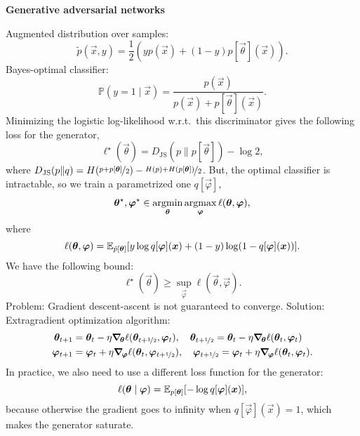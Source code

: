 \documentclass[10pt]{article}
\newenvironment{topic}[1]
{\textbf{\sffamily \colorbox{black}{\rlap{\textbf{\textcolor{white}{#1}}}\hspace{\linewidth}\hspace{-2\fboxsep}}}}
{}
\newenvironment{subtopic}[1]
{\begin{center}\textbf{\sffamily #1}\end{center}}
{}
\begin{document}
\begin{multicols*}{3}
\begin{topic}{Generative models}
\begin{subtopic}{Generative adversarial networks}
            Augmented distribution over samples: \[
                \tilde{p}(\vec{x},y) = \frac{1}{2} (yp(\vec{x}) + (1-y)p[\vec{\theta}](\vec{x})).
            \]
            Bayes-optimal classifier: \[
                \mathbb{P}(y=1 \mid \vec{x}) = \frac{p(\vec{x})}{p(\vec{x}) + p[\vec{\theta}](\vec{x})}.
            \]
            Minimizing the logistic log-likelihood w.r.t.\ this discriminator gives the following loss for the
            generator, \[
                \ell^\star(\vec{\theta}) = D_{\mathrm{JS}}(p \| p[\vec{\theta}]) - \log 2,
            \]
            where $D_{\mathrm{JS}}(p \| q) = H(\nicefrac{p + p[\vec{\theta}]}{2}) - \nicefrac{H(p) +
                    H(p[\vec{\theta}])}{2}$. But, the optimal classifier is intractable, so we train a parametrized one
            $q[\vec{\varphi}]$, \[
                \vec{\theta}^\star, \vec{\varphi}^\star \in \argmin_{\vec{\theta}} \argmax_{\vec{\varphi}} \ell(\vec{\theta}, \vec{\varphi}),
            \]
            where \[
                \ell(\vec{\theta}, \vec{\varphi}) = \E_{\tilde{p}[\vec{\theta}]}[y \log q[\vec{\varphi}](\vec{x}) + (1-y) \log (1-q[\vec{\varphi}](\vec{x}))].
            \]
            We have the following bound: \[
                \ell^\star(\vec{\theta}) \geq \sup_{\vec{\varphi}} \ell(\vec{\theta}, \vec{\varphi}).
            \]
            Problem: Gradient descent-ascent is not guaranteed to converge. Solution: Extragradient
            optimization algorithm:
            \begin{align*}
                \vec{\theta}_{t+1}  & = \vec{\theta}_t - \eta \grad{\ell(\vec{\theta}_{t+\nicefrac{1}{2}}, \vec{\varphi}_t)}{\vec{\theta}}, \quad \vec{\theta}_{t+\nicefrac{1}{2}} = \vec{\theta}_t - \eta \grad{\ell(\vec{\theta}_t, \vec{\varphi}_t)}{\vec{\theta}}       \\
                \vec{\varphi}_{t+1} & = \vec{\varphi}_t + \eta \grad{\ell(\vec{\theta}_t, \vec{\varphi}_{t+\nicefrac{1}{2}})}{\vec{\varphi}}, \quad \vec{\varphi}_{t+\nicefrac{1}{2}} = \vec{\varphi}_t + \eta \grad{\ell(\vec{\theta}_t, \vec{\varphi}_t)}{\vec{\varphi}}.
            \end{align*}
            In practice, we also need to use a different loss function for the generator: \[
                \ell(\vec{\theta} \mid \vec{\varphi}) = \E_{p[\vec{\theta}]}[-\log q[\vec{\varphi}](\vec{x})],
            \]
            because otherwise the gradient goes to infinity when $q[\vec{\varphi}](\vec{x}) = 1$, which makes
            the generator saturate.
        \end{subtopic}


\end{topic}
\end{multicols*}
\end{document}
